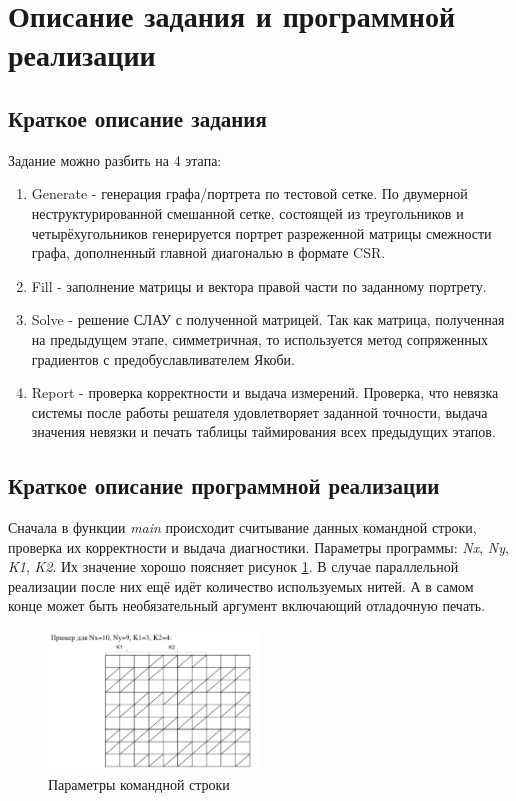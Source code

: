 \section{Описание задания и программной реализации}
	\subsection{Краткое описание задания}
		Задание можно разбить на 4 этапа:
		\begin{enumerate}
			\item Generate - генерация графа/портрета по тестовой сетке. По двумерной неструктурированной смешанной сетке, состоящей из треугольников и четырёхугольников генерируется портрет разреженной матрицы смежности графа, дополненный главной диагональю в формате CSR.
			\item Fill - заполнение матрицы и вектора правой части по заданному портрету.
			\item Solve - решение СЛАУ с полученной матрицей. Так как матрица, полученная на предыдущем этапе, симметричная, то используется метод сопряженных градиентов с предобуславливателем Якоби.
			\item Report - проверка корректности и выдача измерений. Проверка, что невязка системы после работы решателя удовлетворяет заданной точности, выдача значения невязки и печать таблицы таймирования всех предыдущих этапов.

		\end{enumerate}

	\subsection{Краткое описание программной реализации}
		Сначала в функции \textit{main} происходит считывание данных командной строки, проверка их корректности и выдача диагностики. Параметры программы: \textit{Nx}, \textit{Ny}, \textit{K1}, \textit{K2}. Их значение хорошо поясняет рисунок \ref{param}. В случае параллельной реализации после них ещё идёт количество используемых нитей. А в самом конце может быть необязательный аргумент включающий отладочную печать.
			\begin{figure}[H]
		        \centering
		        \includegraphics[width=0.5\textwidth]{./images/param}
		        \caption{Параметры командной строки}
		        \label{param}
		    \end{figure}

